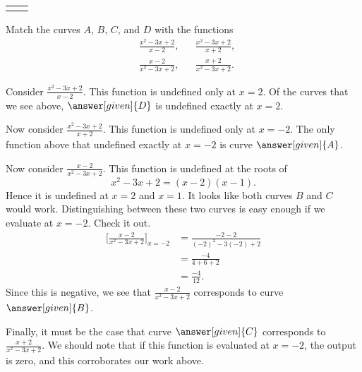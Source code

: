 \documentclass{ximera}
\begin{document}
\begin{example}
\begin{image}
\begin{tabular}{cc}
\begin{tikzpicture}
\begin{axis}
      \end{axis}
    \end{tikzpicture}
  \end{tabular}
\end{image}
Match the curves $A$, $B$, $C$, and $D$ with the functions
  \begin{align*}
    &\frac{x^2-3x+2}{x-2}, &&\frac{x^2-3x+2}{x+2}, \\
    &\frac{x-2}{x^2-3x+2}, &&\frac{x+2}{x^2-3x+2}.
  \end{align*}
\begin{explanation}
  Consider $\frac{x^2-3x+2}{x-2}$. This function is undefined only at
  $x=2$. Of the curves that we see above, $\answer[given]{D}$ is
  undefined exactly at $x=2$.

  Now consider $\frac{x^2-3x+2}{x+2}$. This function is undefined only
  at $x=-2$. The only function above that undefined exactly at $x=-2$
  is curve $\answer[given]{A}$.

  Now consider $\frac{x-2}{x^2-3x+2}$. This function is undefined at
  the roots of
  \[
  x^2-3x+2 = (x-2)(x-1).
  \]
  Hence it is undefined at $x=2$ and $x=1$. It looks like both curves
  $B$ and $C$ would work. Distinguishing between these two curves is
  easy enough if we evaluate at $x=-2$. Check it out.
  \begin{align*}
    \bigg[\frac{x-2}{x^2-3x+2}\bigg]_{x=-2} &= \frac{-2-2}{(-2)^2-3(-2)+2}\\
    &= \frac{-4}{4+6+2}\\
    &=\frac{-4}{12}.
  \end{align*}
  Since this is negative, we see that $\frac{x-2}{x^2-3x+2}$
  corresponds to curve $\answer[given]{B}$.

  Finally, it must be the case that curve $\answer[given]{C}$
  corresponds to $\frac{x+2}{x^2-3x+2}$. We should note that if this
  function is evaluated at $x=-2$, the output is zero, and this
  corroborates our work above.
\end{explanation}
\end{example}


\end{document}
